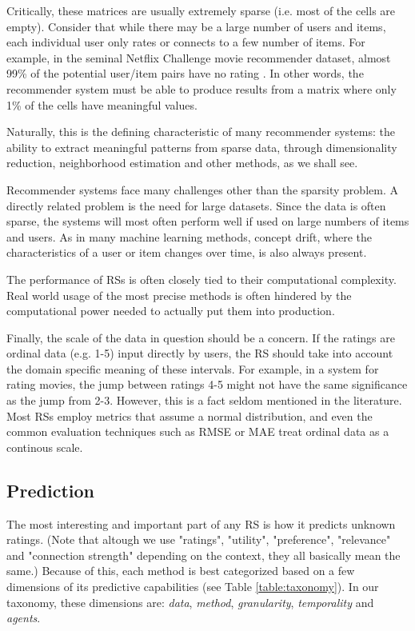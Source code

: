 Critically, these matrices are usually extremely sparse (i.e. most of the cells are empty). 
Consider that while there may be a large number of users and items, each individual user
only rates or connects to a few number of items. 
For example, in the seminal Netflix Challenge movie recommender dataset, almost 99\% of the potential
user/item pairs have no rating \citep[p1]{Bell2007d}. In other words, the recommender system must be able
to produce results from a matrix where only 1\% of the cells have meaningful values.

Naturally, this is the defining characteristic of 
many recommender systems: the ability to extract meaningful patterns from sparse data, 
through dimensionality reduction, neighborhood estimation and other methods, as we shall see.

Recommender systems face many challenges other than the sparsity problem.
A directly related problem is the need for large datasets. Since the data is often sparse,
the systems will most often perform well if used on large numbers of items and users.
As in many machine learning methods, concept drift, where the characteristics of a user or item
changes over time, is also always present.

The performance of RSs is often closely tied to their computational complexity. 
Real world usage of the most precise methods is often hindered by the computational power
needed to actually put them into production.

Finally, the scale of the data in question should be a concern. If the ratings are ordinal data (e.g. 1-5)
input directly by users, the RS should take into account the domain specific meaning of these intervals.
For example, in a system for rating movies, the jump between ratings 4-5 might not have the same significance as
the jump from 2-3. However, this is a fact seldom mentioned in the literature. Most RSs 
employ metrics that assume a normal distribution, and even the common
evaluation techniques such as RMSE or MAE treat ordinal data as a continous scale. 


\subsection{Prediction}

The most interesting and important part of any RS is how it predicts unknown ratings.
(Note that altough we use "ratings", "utility", "preference", "relevance" and "connection strength" depending on the context, they all basically mean the same.)
Because of this, each method is best categorized based on a few dimensions of its predictive capabilities (see Table \ref{table:taxonomy}).
In our taxonomy, these dimensions are: \emph{data}, \emph{method}, \emph{granularity}, \emph{temporality} and \emph{agents}.

